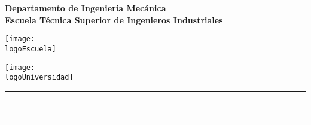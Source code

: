 
\begin{titlepage}



\newlength{\centeroffset}
\setlength{\centeroffset}{-0.5\oddsidemargin}

\noindent\hspace*{\centeroffset}
\begin{minipage}{\textwidth}
\centering
\LARGE\textbf{Departamento de Ingeniería Mecánica}\\
\Large\textbf{Escuela Técnica Superior de Ingenieros Industriales}\\
\end{minipage}

\vspace{1cm}

    \begin{minipage}[t]{0.4\textwidth}
        \centering
        \texttt{[image: \\logoEscuela]}
    \end{minipage}%
    \begin{minipage}[t]{0.6\textwidth}
        \centering
        \texttt{[image: \\logoUniversidad]}
    \end{minipage}
    
\vspace{1cm}


\noindent\rule[-1ex]{\textwidth}{1pt}\\[3.5ex] %
\noindent\begin{minipage}{\textwidth}
\centering
\begin{spacing}{1.5}{\huge\bfseries \titulo}\end{spacing}
\noindent\rule[-1ex]{\textwidth}{1pt}\\[3.5ex] %

\vspace{2cm}


\end{minipage}
\end{titlepage}
